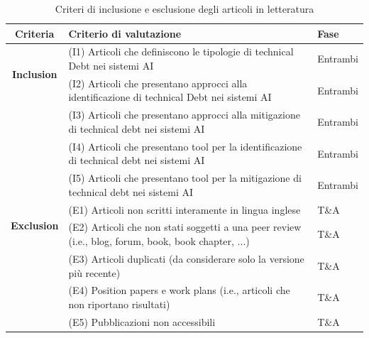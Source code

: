 \begin{table}[h!]
    \centering
    \begin{tabular}{|c|p{6cm}|p{1.6cm}|}
    \hline
    \textbf{Criteria} & \textbf{Criterio di valutazione} & \textbf{Fase} \\ \hline 
    \multirow{2}{*}{\textbf{Inclusion}} & (I1) Articoli che definiscono le tipologie di technical Debt nei sistemi AI & Entrambi \\ \cline{2-3} 
    & (I2) Articoli che presentano approcci alla identificazione di technical Debt nei sistemi AI & Entrambi  \\\cline{2-3} 
    & (I3) Articoli che presentano approcci alla mitigazione di technical debt nei sistemi AI & Entrambi \\ \cline{2-3} 
    & (I4) Articoli che presentano tool per la identificazione di technical debt nei sistemi AI & Entrambi \\\cline{2-3}  
    & (I5) Articoli che presentano tool per la mitigazione di technical debt nei sistemi AI & Entrambi \\ \hline 
    \multirow{2}{*}{\textbf{Exclusion}} & (E1) Articoli non scritti interamente in lingua inglese & T\&A\\ \cline{2-3} 
    & (E2) Articoli che non stati soggetti a una peer review (i.e., blog, forum, book, book chapter, ...) &  T\&A\\ \cline{2-3} 
    & (E3) Articoli duplicati (da considerare solo la versione più recente) & T\&A \\ \cline{2-3} 
    & (E4) Position papers e work plans (i.e., articoli che non riportano risultati) & T\&A \\ \cline{2-3} 
    & (E5) Pubblicazioni non accessibili & T\&A \\ \hline
    \end{tabular}
    \caption{Criteri di inclusione e esclusione degli articoli in letteratura }
    \label{tab:criteria}
\end{table}

